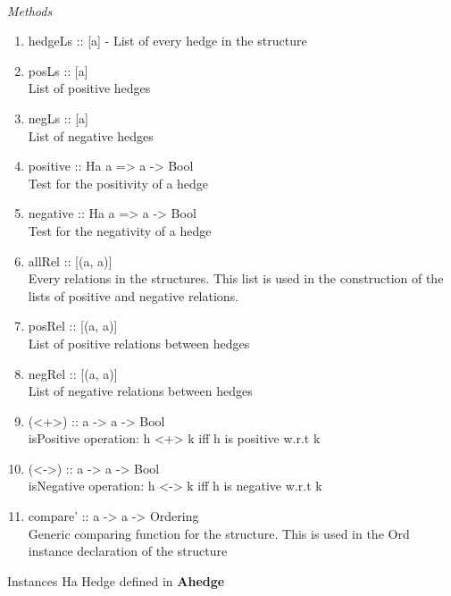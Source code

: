 \documentclass[../gr-final.tex]{subfiles}
\begin{document}
\paragraph{}
\emph{Methods}

\begin{enumerate}
        \item hedgeLs :: [a] - List of every hedge in the structure

        \item posLs :: [a]\\
        List of positive hedges

        \item negLs :: [a]\\
           List of negative hedges

        \item  positive :: Ha a => a -> Bool\\
           Test for the positivity of a hedge

        \item  negative :: Ha a => a -> Bool\\
          Test for the negativity of a hedge

        \item  allRel :: [(a, a)]\\
          Every relations in the structures. This list is used in the
          construction of the lists of positive and negative relations.
        \item  posRel :: [(a, a)]\\
          List of positive relations between hedges

        \item  negRel :: [(a, a)]\\
          List of negative relations between hedges

        \item  (<+>) :: a -> a -> Bool\\
          isPositive operation: h <+> k iff h is positive w.r.t k
        \item  (<->) :: a -> a -> Bool\\
          isNegative operation: h <-> k iff h is negative w.r.t k
        \item  compare' :: a -> a -> Ordering\\
          Generic comparing function for the structure. This is used in
          the Ord instance declaration of the structure
\end{enumerate}
Instances Ha Hedge defined in {\bfseries Ahedge}
\end{document}
